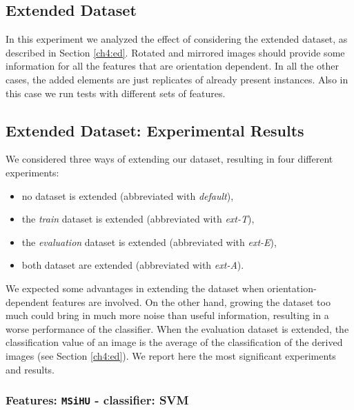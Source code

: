 \vspace{0.5cm}


\subsection{Extended Dataset}

In this experiment we analyzed the effect of considering the extended dataset, as described in Section \ref{ch4:ed}. Rotated and mirrored images should provide some information for
all the features that are orientation dependent. In all the other cases, the added elements are just replicates of already present instances.
Also in this case we run tests with different sets of features.


\vspace{0.5cm}

\subsection{Extended Dataset: Experimental Results}

We considered three ways of extending our dataset, resulting in four different experiments:

\begin{itemize}
 \item no dataset is extended (abbreviated with \textit{default}),
 \item the \textit{train} dataset is extended (abbreviated with \textit{ext-T}),
 \item the \textit{evaluation} dataset is extended (abbreviated with \textit{ext-E}),
 \item both dataset are extended (abbreviated with \textit{ext-A}). 
\end{itemize}

We expected some advantages in extending the dataset when orientation-dependent features are involved. On the other hand,
growing the dataset too much could bring in much more noise than useful information, resulting in a worse performance of the classifier.
When the evaluation dataset is extended, the classification value of an image is the average of the classification of the derived images (see Section \ref{ch4:ed}).
We report here the most significant experiments and results.

\vspace{0.5cm}

\subsubsection{Features: \texttt{MSiHU} - classifier: SVM}

